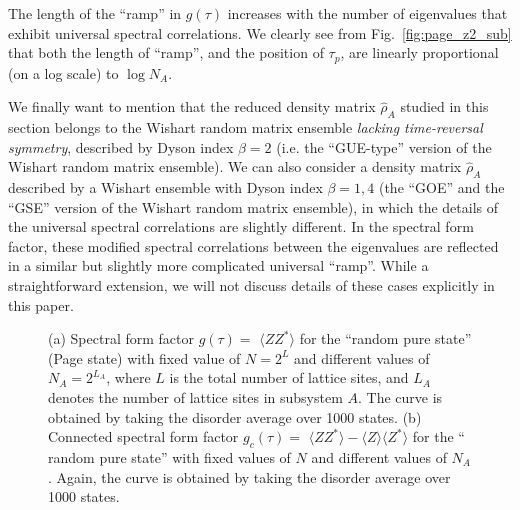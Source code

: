 \documentclass[aps,prb,preprint,onecolumn,amsmath,amssymb,superscriptaddress,eqsecnum,floatfix,scrartcl]{revtex4-1}
\begin{document}
The length of the ``ramp'' in $g(\tau)$  increases
with the number of eigenvalues that 
exhibit 
universal spectral 
correlations.\cite{Cotler2016}
We clearly see from
Fig.~\ref{fig:page_z2_sub}
that both the length of ``ramp'', and the position of $\tau_p$, are linearly proportional (on a log scale) to $\log N_A$. 

We finally
want to mention that the reduced density matrix ${\hat \rho}_A$ studied in this section belongs to the Wishart random matrix ensemble 
{\it lacking time-reversal symmetry}, described by Dyson index  $\beta=2$ (i.e. the ``GUE-type'' version of the Wishart random matrix ensemble).
We can also consider a density matrix  ${\hat \rho}_A$ described by  a Wishart ensemble with Dyson index $\beta=1, 4$ (the ``GOE'' and the ``GSE'' version of the Wishart random matrix ensemble), in which the details of 
the universal spectral
correlations are slightly different. In the spectral form factor, these modified spectral correlations
between the eigenvalues  are  reflected in a similar but slightly  more complicated  universal ``ramp''.\cite{loggas} While a straightforward extension,
we will not discuss details of these cases 
explicitly in this paper. 

%

\begin{figure}[hbt]
\centering
\caption{
(a) Spectral form factor $g(\tau)=$  $\langle ZZ^*\rangle$ for the ``random pure
state'' (Page state) with fixed value of $N=2^L$ and 
different values of  $N_A=2^{L_A}$, where $L$  is the total number of lattice sites, and $L_A$ denotes the number of lattice sites in subsystem $A$.
 The curve is obtained by taking the  disorder average over 1000 states.
 (b) Connected spectral form factor $g_c(\tau)=$ $\langle ZZ^*\rangle-\langle Z\rangle\langle Z^*\rangle$ for the
`` random pure
state'' with fixed
values of $N$ and different values of $N_A$. 
Again, the curve is obtained by taking the  disorder average over 1000 states.
}
\label{fig:page}
\end{figure}
\end{document}
